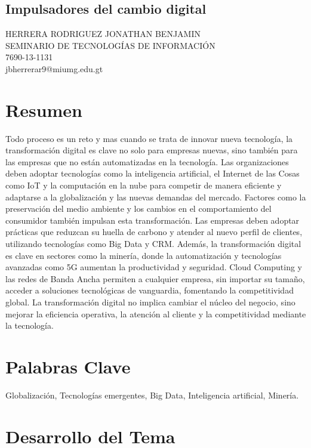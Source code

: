 \documentclass[12pt]{article}
\begin{document}
\begin{center}
\section*{Impulsadores del cambio digital}
HERRERA RODRIGUEZ JONATHAN BENJAMIN
\\SEMINARIO DE TECNOLOGÍAS DE INFORMACIÓN
\\7690-13-1131
\\jbherrerar9@miumg.edu.gt
\end{center}
\section{Resumen}

Todo proceso es un reto y mas cuando se trata de innovar nueva tecnología, la transformación digital es clave no solo para empresas nuevas, sino también para las empresas que no están automatizadas en la tecnología. Las organizaciones deben adoptar tecnologías como la inteligencia artificial, el Internet de las Cosas como IoT y la computación en la nube para competir de manera eficiente y adaptarse a la globalización y las nuevas demandas del mercado. Factores como la preservación del medio ambiente y los cambios en el comportamiento del consumidor también impulsan esta transformación. Las empresas deben adoptar prácticas que reduzcan su huella de carbono y atender al nuevo perfil de clientes, utilizando tecnologías como Big Data y CRM. Además, la transformación digital es clave en sectores como la minería, donde la automatización y tecnologías avanzadas como 5G aumentan la productividad y seguridad. Cloud Computing y las redes de Banda Ancha permiten a cualquier empresa, sin importar su tamaño, acceder a soluciones tecnológicas de vanguardia, fomentando la competitividad global. La transformación digital no implica cambiar el núcleo del negocio, sino mejorar la eficiencia operativa, la atención al cliente y la competitividad mediante la tecnología.

\section{Palabras Clave}
Globalización, Tecnologías emergentes, Big Data, Inteligencia artificial, Minería.

\section{Desarrollo del Tema}
\end{document}
